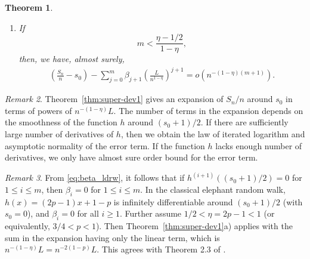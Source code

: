 \documentclass[12pt]{amsart}
\theoremstyle{plain}
\newtheorem{theorem}{Theorem}[section]
\theoremstyle{remark}
\newtheorem{remark}[theorem]{Remark}
\numberwithin{equation}{section}
\begin{document}
{\begin{theorem}
\begin{enumerate}
\begin{align}
    \right) \nonumber \\
    =-&\liminf_{n\to\infty}\sqrt{\frac{n}{2\log \log n}}\left(\left(\frac{S_n}{n} - s_0\right) - \sum_{j = 0}^{m_0} \beta_{j+1}\left(\frac{L}{n^{1-\eta}}\right)^{j+1} \right)
   = \sqrt{\frac{1 - s^2_0}{2\eta -1}},
\end{align}
and
\begin{align}\label{eq:sclt-ldrw}
    \sqrt{n}\left(\left(\frac{S_n}{n} - s_0\right) - \sum_{j = 0}^{m_0} \beta_{j+1}\left(\frac{L}{n^{1-\eta}}\right)^{j+1}\right) \stackrel{d}{\to} {N}\left(0, \frac{1 - s^2_0}{2\eta -1}\right).
\end{align}
\item[b)] If \[ m < \frac{\eta - 1/2}{1-\eta},\] 
then, we have, almost surely,
\begin{align}\label{eq:s-ldrw}
    \left(\frac{S_n}{n} - s_0\right) - \sum_{j = 0}^{m} \beta_{j+1}\left(\frac{L}{n^{1-\eta}}\right)^{j+1} 
    {=}  o\left({n}^{-(1-\eta)(m+1)}\right).  
\end{align}
\end{enumerate}
\end{theorem}}

{
\begin{remark}\label{rem:0}
    Theorem~\ref{thm:super-dev1} gives an expansion of $S_n/n$ around $s_0$ in terms of powers of $n^{-(1-\eta)}L$. The number of terms in the expansion depends on the smoothness of the function $h$ around $(s_0+1)/2$. If there are sufficiently large number of derivatives of $h$, then we obtain the law of iterated logarithm and asymptotic normality of the error term. If the function $h$ lacks enough number of derivatives, we only have almost sure order bound for the error term.
\end{remark}}

{
\begin{remark}\label{rem:1}
   From \eqref{eq:beta_ldrw}, it follows that if $h^{(i+1)}((s_0+1)/2) = 0$ for $1 \leq i \leq m$, then $\beta_i = 0$ for $1 \leq i \leq m$. In the classical elephant random walk, $h(x) = (2p-1)x+1-p$ %
    is infinitely differentiable around $(s_0+1)/2$ (with $s_0 = 0$), and $\beta_i = 0$ for all $i \geq 1$. Further assume $1/2 < \eta  = 2p-1 < 1$ (or equivalently, $3/4 < p < 1$). Then Theorem~\ref{thm:super-dev1}a) applies with the sum in the expansion having only the linear term, which is $n^{-(1-\eta)}L = n^{-2(1-p)}L$.   
    This agrees with Theorem 2.3 of \cite{kubota2019gaussian}.
\end{remark}}
\end{document}
